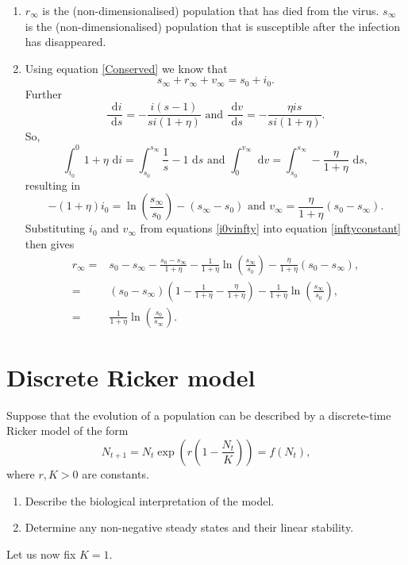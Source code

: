 \documentclass[10pt]{article}
\newcommand{\bb}{\begin{equation}}
\newcommand{\ee}{\end{equation}}
\newcommand{\rd}{\text{ d}}
\newcommand{\eqn}[1]{equation \eqref{#1}}
\renewcommand{\l}{\left(}
\renewcommand{\r}{\right)}
\newcounter{Counter1}
\begin{document}
\begin{Answ}
\begin{enumerate}
\item $r_\infty$ is the (non-dimensionalised) population that has died from the virus. $s_\infty$ is the (non-dimensionalised) population that is susceptible after the infection has disappeared.

\item Using \eqn{Conserved} we know that
\bb
s_\infty+r_\infty+v_\infty=s_0+i_0.\label{inftyconstant}
\ee
Further
\bb
\frac{\rd i}{\rd s}=-\frac{i(s-1)}{si(1+\eta)} \text{ and }\frac{\rd v}{\rd s}=-\frac{\eta is}{si(1+\eta)}.\nonumber
\ee
So,
\bb
\int^0_{i_0}1+\eta\rd i=\int^{s_\infty}_{s_0}\frac{1}{s}-1\rd s \text{ and } \int^{v_\infty}_0 \rd v=\int^{s_\infty}_{s_0}-\frac{\eta}{1+\eta}\rd s,\nonumber
\ee
resulting in
\bb
-(1+\eta)i_0=\ln\l\frac{s_\infty}{s_0}\r-(s_\infty-s_0)\text{ and }v_\infty=\frac{\eta}{1+\eta}\l s_0-s_\infty\r.\label{i0vinfty}
\ee
Substituting $i_0$ and $v_\infty$ from equations \eqref{i0vinfty} into \eqn{inftyconstant} then gives
\begin{align}
r_\infty=&s_0-s_\infty-\frac{s_0-s_\infty}{1+\eta}-\frac{1}{1+\eta}\ln\l\frac{s_\infty}{s_0}\r-\frac{\eta}{1+\eta}(s_0-s_\infty),\nonumber\\
=&(s_0-s_\infty)\l 1- \frac{1}{1+\eta}-\frac{\eta}{1+\eta}\r-\frac{1}{1+\eta}\ln\l\frac{s_\infty}{s_0}\r,\nonumber\\
=&\frac{1}{1+\eta}\ln\l\frac{s_0}{s_\infty}\r.
\end{align}
\end{enumerate}
\end{Answ}







\section{Discrete Ricker model}
Suppose that the evolution of a population can be described by a discrete-time Ricker
model of the form
\bb
N_{t+1} = N_t \exp\l r\l 1-\frac{N_t}{K}\r\r=f(N_t),
\ee
where $r,K>0$ are constants.
\begin{enumerate}
\item Describe the biological interpretation of the model.
\item Determine any non-negative steady states and their linear stability.
\setcounter{Counter1}{\value{enumi}}
\end{enumerate}

\noindent Let us now fix $K=1$.
\end{document}
